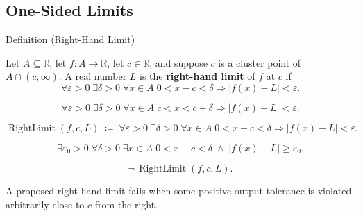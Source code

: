 
\subsection*{One-Sided Limits}
\label{sec:one-sided-limits}

\begin{definitionbox}{Definition (Right-Hand Limit)}
\begin{definition}
\label{def:right-hand-limit}
Let $A\subseteq\mathbb{R}$, let $f:A\to\mathbb{R}$, let $c\in\mathbb{R}$,
and suppose $c$ is a cluster point of $A\cap(c,\infty)$. A real number
$L$ is the \textbf{right-hand limit} of $f$ at $c$ if
\[
  \forall\varepsilon>0\;\exists\delta>0\;\forall x\in A\;
  0<x-c<\delta\Rightarrow |f(x)-L|<\varepsilon.
\]
\end{definition}
\end{definitionbox}

\begin{remark*}
\[
  \forall\varepsilon>0\;\exists\delta>0\;\forall x\in A\;
  c<x<c+\delta\Rightarrow |f(x)-L|<\varepsilon.
\]
\end{remark*}

\begin{remark*}
\[
  \operatorname{RightLimit}(f,c,L)
  \;\coloneqq\;
  \forall\varepsilon>0\;\exists\delta>0\;\forall x\in A\;
  0<x-c<\delta\Rightarrow |f(x)-L|<\varepsilon.
\]
\end{remark*}

\begin{remark*}
\[
  \exists\varepsilon_0>0\;\forall\delta>0\;\exists x\in A\;
  0<x-c<\delta\;\wedge\; |f(x)-L|\geq\varepsilon_0.
\]
\end{remark*}

\begin{remark*}
\[
  \neg\,\operatorname{RightLimit}(f,c,L).
\]
\end{remark*}

\begin{remark*}
A proposed right-hand limit fails when some positive output tolerance is
violated arbitrarily close to $c$ from the right.
\end{remark*}

